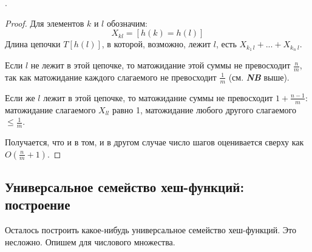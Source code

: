  .
\begin{proof}
Для элементов $k$ и $l$ обозначим:
$$X_{kl} = [h(k) = h(l)]$$
Длина цепочки $T[h(l)]$, в которой, возможно, лежит $l$, есть $X_{k_1\, l} + ... + X_{k_n\ l}$. 

Если $l$ не лежит в этой цепочке, то матожидание этой суммы не превосходит $\frac{n}{m}$, так как матожидание каждого слагаемого не превосходит $\frac{1}{m}$ (см. \textit{\textbf{NB}} выше). 

Если же $l$ лежит в этой цепочке, то матожидание суммы не превосходит $1 + \frac{n-1}{m}$: матожидание слагаемого $X_{ll}$ равно 1, матожидание любого другого слагаемого $\leq \frac{1}{m}$. 

Получается, что и в том, и в другом случае число шагов оценивается сверху как $O(\frac{n}{m}+1)$. 
\end{proof}

\subsection{Универсальное семейство хеш-функций: построение}
Осталось построить какое-нибудь универсальное семейство хеш-функций. Это несложно. Опишем для числового множества.

